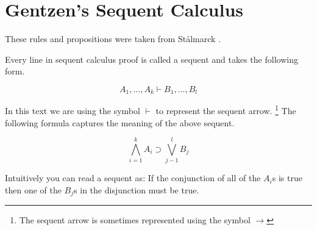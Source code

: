 \appendix



\section{Gentzen's Sequent Calculus}
These rules and propositions were taken from St{\aa}lmarck \cite{GS00}.
\label{def:sequent}
\begin{mydef}[Sequent]
Every line in sequent calculus proof is called a sequent and takes the
following form. 

$$ A_1, \ldots , A_k \vdash B_1, \ldots ,B_l$$

In this text we are using the symbol $\vdash$ to represent the sequent arrow.
\footnote{The sequent arrow is sometimes represented using the symbol $\to$}
The following formula captures the meaning of the above sequent.

$$ \bigwedge_{i = 1}^{k} A_i \supset  \bigvee_{j-1}^l B_j$$

\end{mydef}
 
\medskip

Intuitively you can read a sequent as: If the conjunction of all of the $A_i$s
is true then one of the $B_j$s in the disjunction must be true.

\medskip

